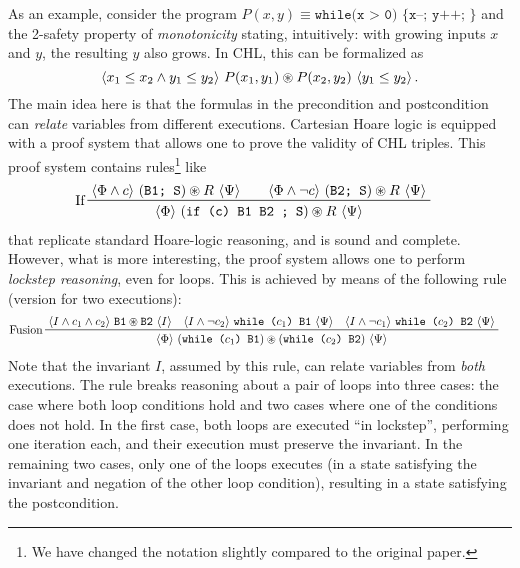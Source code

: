 As an example, consider the program $P(x,y) \equiv \texttt{while(x > 0) \{ x--; y++; \} }$ and the 2-safety property
of \emph{monotonicity} stating, intuitively: with growing inputs $x$ and $y$, the resulting $y$ also grows.
In CHL, this can be formalized as
\begin{equation}\label{eq:mono_formula}
\langle x_1 \leq x_2 \land y_1 \leq y_2  \rangle\ P(x_1, y_1)\circledast{}P(x_2, y_2)\  \langle y_1 \leq y_2 \rangle \, .
\end{equation}
The main idea here is that the formulas in the precondition and
postcondition can \emph{relate} variables from different executions.
%
Cartesian Hoare logic is equipped with a proof system that allows one to prove the validity of CHL triples.
This proof system contains rules\footnote{We have changed the notation
  slightly compared to the original paper.} like
\begin{align}\label{chlRule:If}
    & \prftree[l]{If}
      { %
        { \chl{\Phi \land c}{(\texttt{B1; S}) \st R}{\Psi} } \qquad
        { \chl{\Phi \land \neg c}{(\texttt{B2; S}) \st R}{\Psi} }
      }
      { \chl{\Phi}{(\texttt{if (c) {B1} {B2} ; S}) \st R}{\Psi} }
\end{align}
that replicate standard Hoare-logic reasoning, and is sound and complete. 
However, what is more interesting, the proof system allows one to perform \emph{lockstep reasoning},
even for loops. This is achieved by means of the following rule (version for two executions):
\begin{align*}
  & \prftree[l]{Fusion}
    {
    \chl{I \land c_1 \land c_2}{\texttt{B1} \st \texttt{B2}}{I} \quad
    \chl{I \land \neg c_2}{\texttt{while (}c_1\texttt{) {B1}}}{\Psi} \quad
    \chl{I \land \neg c_1}{\texttt{while (}c_2\texttt{) {B2}}}{\Psi}    
  }
  { \chl{\Phi}{(\texttt{while (}c_1\texttt{) {B1}}) \st (\texttt{while (}c_2\texttt{) {B2}})} {\Psi}}
\end{align*}
Note that the invariant $I$, assumed by this rule, can relate variables from \emph{both} executions.
%
The rule breaks reasoning about a pair of loops into three cases: the case
where both loop conditions hold and two cases where one of the conditions
does not hold.  In the first case, both loops are executed ``in lockstep'',
performing one iteration each, and their execution must preserve the
invariant. In the remaining two cases, only one of the loops executes (in a
state satisfying the invariant and negation of the other loop condition),
resulting in a state satisfying the postcondition.


